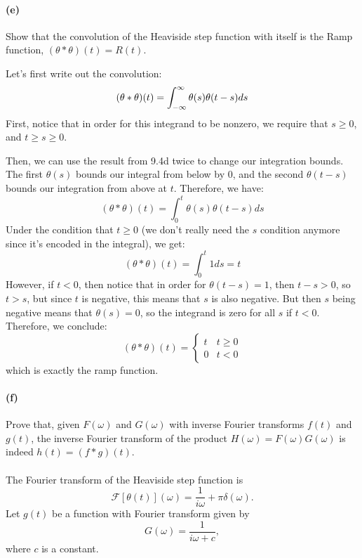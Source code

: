 \documentclass{article}
\begin{document}
\paragraph{(e)}
Show that the convolution of the Heaviside step function with itself is the Ramp function, $(\theta\ast\theta)(t) = R(t)$.

\begin{solution}
	Let's first write out the convolution:
	\[
		(\theta \ast \theta) (t) = \int_{-\infty}^{\infty} \theta(s) \theta(t - s) ds
	\] 
	First, notice that in order for this integrand to be nonzero, we require that $s \ge 0$, and 
	$t \ge s \ge 0$.

	Then, we can use the result from 9.4d twice to change our integration bounds. The first $\theta(s)$ 
	bounds our integral from below by 0, and the second $\theta(t - s)$ bounds our integration from 
	above at $t$. Therefore, we have:
	\[
		(\theta \ast \theta)(t) = \int_{0}^t \theta(s)\theta(t - s) ds
	\] 
	Under the condition that $t \ge 0$ (we don't really need the $s$ condition anymore since it's encoded in 
	the integral), we get:
	\[
		(\theta \ast \theta)(t) = \int_0^t 1 ds = t
	\] 
	However, if $t < 0$, then notice that in order for $\theta(t - s) =1$, then $t - s > 0$, so $t > s$, but 
	since $t$ is negative, this means that $s$ is also negative. But then $s$ being negative 
	means that $\theta(s) = 0$, so the integrand is zero for all $s$ if $t < 0$. Therefore, we conclude:
	\[
		(\theta \ast \theta) (t) = \begin{cases}
			t & t \ge 0\\
			0 & t < 0
		\end{cases}
	\] 
	which is exactly the ramp function.
\end{solution}
\paragraph{(f)}		\extrapart
Prove that, given $F(\omega)$ and $G(\omega)$ with inverse Fourier transforms $f(t)$ and $g(t)$, the inverse Fourier transform of the 
product $H(\omega)=F(\omega)G(\omega)$ is indeed $h(t) = (f\ast g)(t)$.

\phline
\paragraph{}
The Fourier transform of the Heaviside step function is
	\begin{equation}
		\mathcal{F}[\theta(t)](\omega) = \frac{1}{i\omega}+\pi\delta(\omega).
	\label{HeaviFourier}
	\end{equation}
Let $g(t)$ be a function with Fourier transform given by
	\begin{equation*}
		G(\omega) = \frac{1}{i\omega + c},
	\end{equation*}
where $c$ is a constant.
\end{document}
